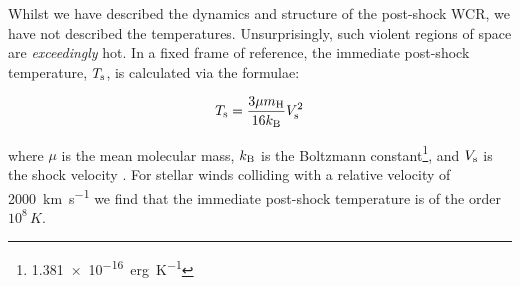 Whilst we have described the dynamics and structure of the post-shock WCR, we have not described the temperatures.
Unsurprisingly, such violent regions of space are \emph{exceedingly} hot.
In a fixed frame of reference, the immediate post-shock temperature, $T_\text{s}$, is calculated via the formulae:

\begin{equation}
  T_\text{s} = \frac{3\mu m_\text{H}}{16 k_\text{B}} V_\text{s}^2
\end{equation}

\noindent
where $\mu$ is the mean molecular mass, $k_\text{B}$ is the Boltzmann constant\footnote{\SI{1.381e-16}{erg.K^{-1}}}, and $V_\text{s}$ is the shock velocity
\parencite[Ch.~9]{macielHydrodynamicsStellarWinds2014}.
For stellar winds colliding with a relative velocity of \SI{2000}{\kilo\metre\per\second} we find that the immediate post-shock temperature is of the order $10^8\,\si{K}$.


